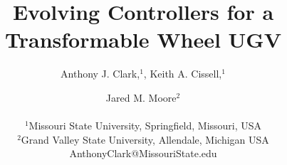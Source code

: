 \documentclass[letterpaper]{article}
\title{Evolving Controllers for a Transformable Wheel UGV}
\author{Anthony J. Clark,$^{1}$, Keith A. Cissell,$^{1}$ \and Jared M. Moore$^{2}$ \\
\mbox{}\\
$^1$Missouri State University, Springfield, Missouri, USA\\
$^2$Grand Valley State University, Allendale, Michigan USA\\
AnthonyClark@MissouriState.edu} %
\begin{document}
\maketitle










%
%









% 


\footnotesize

\end{document}

